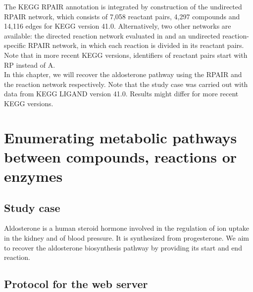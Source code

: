 The KEGG RPAIR annotation is integrated by construction of the undirected RPAIR network, which consists of 7,058 reactant pairs,
4,297 compounds and 14,116 edges for KEGG version 41.0. Alternatively, two other networks are available: the directed reaction network evaluated in
\cite{croes06} and an undirected reaction-specific RPAIR network, in which each reaction is divided in its reactant pairs.\\

Note that in more recent KEGG versions, identifiers of reactant pairs start with RP instead of A.\\

In this chapter, we will recover the aldosterone pathway using the RPAIR and the reaction network respectively.
Note that the study case was carried out with data from KEGG LIGAND version 41.0. Results might differ for more recent KEGG versions.

\section{Enumerating metabolic pathways between compounds, reactions or enzymes}

\subsection{Study case}

Aldosterone is a human steroid hormone involved in the regulation of ion uptake in the kidney and of blood pressure.
It is synthesized from progesterone. We aim to recover the aldosterone biosynthesis pathway by providing
its start and end reaction.

\subsection{Protocol for the web server}

